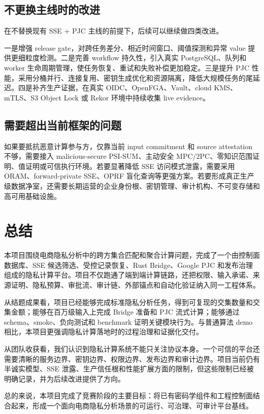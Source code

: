 \documentclass[UTF8,a4paper,12pt,oneside]{ctexrep}
\begin{document}
\section{不更换主线时的改进}

在不替换现有 SSE + PJC 主线的前提下，后续可以继续做四类改进。

一是增强 release gate，对跨任务差分、相近时间窗口、阈值探测和异常 value 提供更细粒度检测。二是完善 workflow 持久性，引入真实 PostgreSQL、队列和 worker 生命周期管理，使任务恢复、重试和失败补偿更加稳定。三是提升 PJC 性能，采用分桶并行、连接复用、密钥生成优化和资源隔离，降低大规模任务的尾延迟。四是补齐生产证据，在真实 OIDC、OpenFGA、Vault、cloud KMS、mTLS、S3 Object Lock 或 Rekor 环境中持续收集 live evidence。

\section{需要超出当前框架的问题}

如果要抵抗恶意计算参与方，仅靠当前 input commitment 和 source attestation 不够，需要接入 malicious-secure PSI-SUM、主动安全 MPC/2PC、零知识范围证明、值证明或可信执行环境。若要显著降低 SSE 访问模式泄露，需要采用 ORAM、forward-private SSE、OPRF 盲化查询等更强方案。若要形成真正生产级数据净室，还需要长期运营的企业身份根、密钥管理、审计机构、不可变存储和高可用基础设施。

\chapter{总结}

本项目围绕电商隐私分析中的跨方集合匹配和聚合计算问题，完成了一个由控制面数据库、SSE 候选筛选、受控记录恢复、Rust Bridge、Google PJC 和发布治理组成的隐私计算平台。项目不仅跑通了端到端计算链路，还把权限、输入承诺、来源证明、隐私预算、审批流、审计链、外部锚点和自动化验证纳入同一工程体系。

从结题成果看，项目已经能够完成标准隐私分析任务，得到可复现的交集数量和交集金额；能够在百万级输入上完成 Bridge 准备和 PJC 流式计算；能够通过 schema、smoke、负向测试和 benchmark 证明关键模块行为。与普通算法 demo 相比，本项目更强调隐私计算落地时的过程治理和证据化交付。

从团队收获看，我们认识到隐私计算系统不能只关注协议本身。一个可信的平台还需要清晰的服务边界、密钥边界、权限边界、发布边界和审计边界。项目当前仍有半诚实模型、SSE 泄露、生产信任根和性能扩展方面的限制，但这些限制已经被明确记录，并为后续改进提供了方向。

总的来说，本项目完成了竞赛阶段的主要目标：将已有密码学组件和工程控制面结合起来，形成一个面向电商隐私分析场景的可运行、可治理、可审计平台基线。
\end{document}
